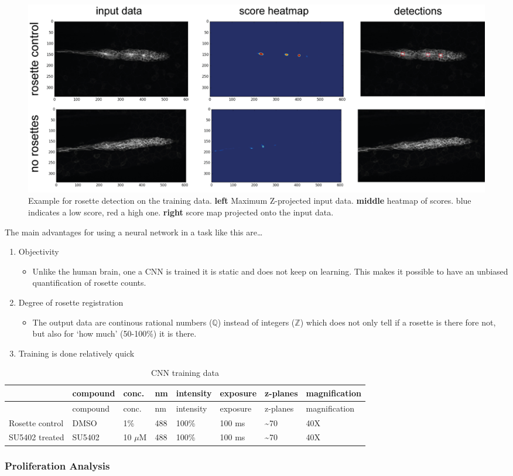 \documentclass[11pt,singlespacinge,twoside]{reedthesis} %
\providecommand{\tightlist}{%
  \setlength{\itemsep}{0pt}\setlength{\parskip}{0pt}}
\begin{document}
\begin{figure}

{\centering \includegraphics[width=0.75\linewidth]{figure/02-MaMo/CNN/CNNtrain} 

}

\caption[Example for rosette detection on the training data]{Example for rosette detection on the training data. \textbf{left} Maximum Z-projected input data. \textbf{middle} heatmap of scores. blue indicates a low score, red a high one. \textbf{right} score map projected onto the input data.}\label{fig:CNNtrain}
\end{figure}
\noindent The main advantages for using a neural network in a task like this are\ldots{}
\begin{enumerate}
\def\labelenumi{\arabic{enumi}.}
\tightlist
\item
  Objectivity
  \begin{itemize}
  \tightlist
  \item
    Unlike the human brain, one a CNN is trained it is static and does not keep on learning. This makes it possible to have an unbiased quantification of rosette counts.
  \end{itemize}
\item
  Degree of rosette registration
  \begin{itemize}
  \tightlist
  \item
    The output data are continous rational numbers (\(\mathbb{Q}\)) instead of integers (\(\mathbb{Z}\)) which does not only tell if a rosette is there fore not, but also for `how much' (50-100\%) it is there.
  \end{itemize}
\item
  Training is done relatively quick
\end{enumerate}
\begin{longtable}[]{@{}llllllll@{}}
\caption{\label{tab:CNNtraining} CNN training data}\tabularnewline
\toprule
& compound & conc. & nm & intensity & exposure & z-planes & magnification\tabularnewline
\midrule
\endfirsthead
\toprule
& compound & conc. & nm & intensity & exposure & z-planes & magnification\tabularnewline
\midrule
\endhead
Rosette control & DMSO & 1\% & 488 & 100\% & 100 ms & \textasciitilde{}70 & 40X\tabularnewline
SU5402 treated & SU5402 & 10 \(\mu\)M & 488 & 100\% & 100 ms & \textasciitilde{}70 & 40X\tabularnewline
\bottomrule
\end{longtable}
\hypertarget{prolif}{%
\subsubsection{Proliferation Analysis}\label{prolif}}
\end{document}
